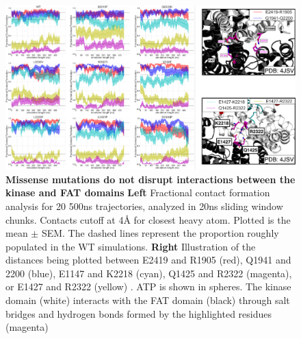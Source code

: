 \documentclass[phd,tocprelim]{cornell}
\begin{document}
\begin{landscape}
	\begin{figure}[p]
		\centering
		\includegraphics[width=1.0\linewidth]{figures/mtor-fig6.pdf}
		\caption[Missense mutations do not disrupt interactions between the kinase and FAT domains]{
			{\bf Missense mutations do not disrupt interactions between the kinase and FAT domains}
			{\bf Left} Fractional contact formation analysis for 20 500ns trajectories, analyzed in 20ns sliding window chunks. Contacts cutoff at 4Å for closest heavy atom.  Plotted is the mean $\pm$ SEM. The dashed lines represent the proportion roughly populated in the WT simulations. {\bf Right} Illustration of the distances being plotted between E2419 and R1905 (red), Q1941 and 2200 (blue), E1147 and K2218 (cyan), Q1425 and R2322 (magenta), or E1427 and R2322 (yellow) . ATP is shown in spheres. The kinase domain (white) interacts with the FAT domain (black) through salt bridges and hydrogen bonds formed by the highlighted residues (magenta) 
		}
		\label{fig:mtor-figure6}
	\end{figure}
\end{landscape}
\end{document}
